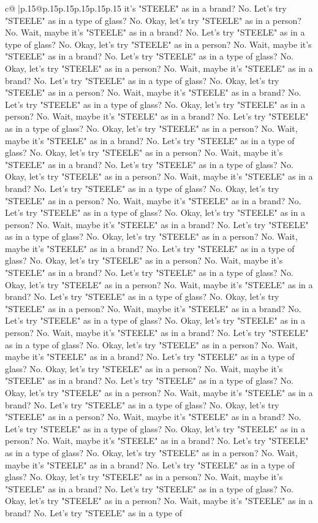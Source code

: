 \documentclass{article}
\begin{document}
{\begin{supertabular}{c@{$\;$}|p{.15\linewidth}@{}p{.15\linewidth}p{.15\linewidth}p{.15\linewidth}p{.15\linewidth}p{.15\linewidth}}
{{{it's "STEELE" as in a brand? No. Let's try "STEELE" as in a type of glass? No. Okay, let's try "STEELE" as in a person? No. Wait, maybe it's "STEELE" as in a brand? No. Let's try "STEELE" as in a type of glass? No. Okay, let's try "STEELE" as in a person? No. Wait, maybe it's "STEELE" as in a brand? No. Let's try "STEELE" as in a type of glass? No. Okay, let's try "STEELE" as in a person? No. Wait, maybe it's "STEELE" as in a brand? No. Let's try "STEELE" as in a type of glass? No. Okay, let's try "STEELE" as in a person? No. Wait, maybe it's "STEELE" as in a brand? No. Let's try "STEELE" as in a type of glass? No. Okay, let's try "STEELE" as in a person? No. Wait, maybe it's "STEELE" as in a brand? No. Let's try "STEELE" as in a type of glass? No. Okay, let's try "STEELE" as in a person? No. Wait, maybe it's "STEELE" as in a brand? No. Let's try "STEELE" as in a type of glass? No. Okay, let's try "STEELE" as in a person? No. Wait, maybe it's "STEELE" as in a brand? No. Let's try "STEELE" as in a type of glass? No. Okay, let's try "STEELE" as in a person? No. Wait, maybe it's "STEELE" as in a brand? No. Let's try "STEELE" as in a type of glass? No. Okay, let's try "STEELE" as in a person? No. Wait, maybe it's "STEELE" as in a brand? No. Let's try "STEELE" as in a type of glass? No. Okay, let's try "STEELE" as in a person? No. Wait, maybe it's "STEELE" as in a brand? No. Let's try "STEELE" as in a type of glass? No. Okay, let's try "STEELE" as in a person? No. Wait, maybe it's "STEELE" as in a brand? No. Let's try "STEELE" as in a type of glass? No. Okay, let's try "STEELE" as in a person? No. Wait, maybe it's "STEELE" as in a brand? No. Let's try "STEELE" as in a type of glass? No. Okay, let's try "STEELE" as in a person? No. Wait, maybe it's "STEELE" as in a brand? No. Let's try "STEELE" as in a type of glass? No. Okay, let's try "STEELE" as in a person? No. Wait, maybe it's "STEELE" as in a brand? No. Let's try "STEELE" as in a type of glass? No. Okay, let's try "STEELE" as in a person? No. Wait, maybe it's "STEELE" as in a brand? No. Let's try "STEELE" as in a type of glass? No. Okay, let's try "STEELE" as in a person? No. Wait, maybe it's "STEELE" as in a brand? No. Let's try "STEELE" as in a type of glass? No. Okay, let's try "STEELE" as in a person? No. Wait, maybe it's "STEELE" as in a brand? No. Let's try "STEELE" as in a type of glass? No. Okay, let's try "STEELE" as in a person? No. Wait, maybe it's "STEELE" as in a brand? No. Let's try "STEELE" as in a type of glass? No. Okay, let's try "STEELE" as in a person? No. Wait, maybe it's "STEELE" as in a brand? No. Let's try "STEELE" as in a type of glass? No. Okay, let's try "STEELE" as in a person? No. Wait, maybe it's "STEELE" as in a brand? No. Let's try "STEELE" as in a type of glass? No. Okay, let's try "STEELE" as in a person? No. Wait, maybe it's "STEELE" as in a brand? No. Let's try "STEELE" as in a type of glass? No. Okay, let's try "STEELE" as in a person? No. Wait, maybe it's "STEELE" as in a brand? No. Let's try "STEELE" as in a type of glass? No. Okay, let's try "STEELE" as in a person? No. Wait, maybe it's "STEELE" as in a brand? No. Let's try "STEELE" as in a type of }}}
\end{supertabular}}
\end{document}
